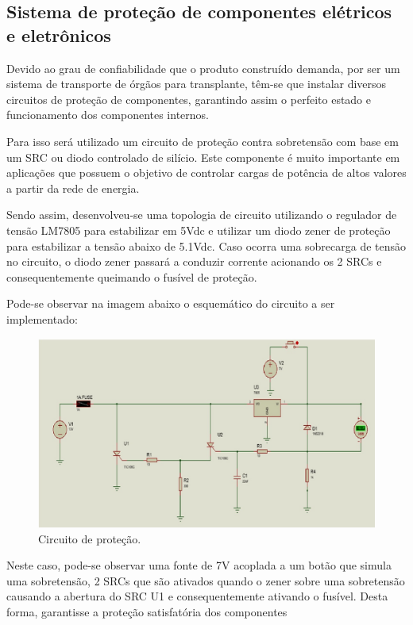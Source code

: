 \subsection{Sistema de proteção de componentes elétricos e eletrônicos}

Devido ao grau de confiabilidade que o produto construído demanda, por ser um sistema de transporte de órgãos para transplante, têm-se que instalar diversos circuitos de proteção de componentes, garantindo assim o perfeito estado e funcionamento dos componentes internos. 

Para isso será utilizado um circuito de proteção contra sobretensão com base em um SRC ou diodo controlado de silício. Este componente é muito importante em aplicações que possuem o objetivo de controlar cargas de potência de altos valores a partir da rede de energia.

Sendo assim, desenvolveu-se uma topologia de circuito utilizando o regulador de tensão LM7805 para estabilizar em 5Vdc e utilizar um diodo zener de proteção para estabilizar a tensão abaixo de 5.1Vdc. Caso ocorra uma sobrecarga de tensão no circuito, o diodo zener passará a conduzir corrente acionando os 2 SRCs e consequentemente queimando o fusível de proteção.

Pode-se observar na imagem abaixo o esquemático do circuito a ser implementado:

\begin{figure}[H]
\centering
\includegraphics[width=16cm]{figuras/circuitoprotecao_eletronica.jpg}
\caption{Circuito de proteção.}
\end{figure}

Neste caso, pode-se observar uma fonte de 7V acoplada a um botão que simula uma sobretensão, 2 SRCs que são ativados quando o zener sobre uma sobretensão  causando a abertura do SRC U1 e consequentemente ativando o fusível. Desta forma,  garantisse  a proteção satisfatória dos componentes
	
